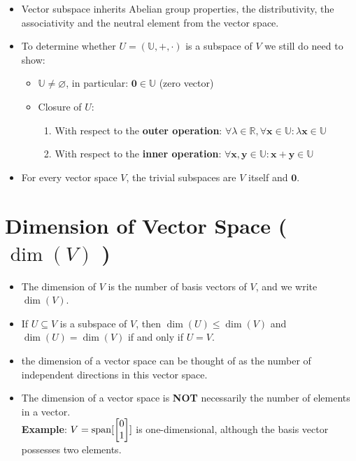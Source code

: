 \begin{itemize}
    \item Vector subspace inherits Abelian group properties, the distributivity, the associativity and the neutral element from the vector space.

    \item To determine whether $U = (\mathbb{U}, +, \cdot)$ is a subspace of $V$ we still do need to show:
    \begin{itemize}
        \item $\mathbb{U} \neq \varnothing$, in particular: $\mathbf{0} \in \mathbb{U}$ (zero vector)
        \item Closure of $U$:
        \begin{enumerate}
            \item With respect to the \textbf{outer operation}: $\forall\lambda \in \mathbb{R}, \forall\mathbf{x} \in \mathbb{U} : \lambda \mathbf{x} \in \mathbb{U}$
            \item With respect to the \textbf{inner operation}: $\forall\mathbf{x, y} \in \mathbb{U} : \mathbf{x + y} \in \mathbb{U}$
        \end{enumerate}
    \end{itemize}

    \item For every vector space $V$, the trivial subspaces are $V$ itself and ${\mathbf{0}}$.
    
\end{itemize}

\section{Dimension of Vector Space ( $\dim(V)$ ) \cite{mfml-1}}\label{lin-alg: Dimension-vector-space}

\begin{itemize}
    \item The dimension of $V$ is the number of basis vectors of $V$, and we write $\dim(V)$.

    \item If $U \subseteq V$ is a subspace of $V$, then $\dim(U) \leq \dim(V)$ and $\dim(U) = \dim(V)$ if and only if $U = V$.

    \item the dimension of a vector space can be thought of as the number of independent directions in this vector space.

    \item The dimension of a vector space is \textbf{NOT} necessarily the number of elements in a vector.\\
    \textbf{Example}: $V = \operatorname{span}[\begin{bmatrix}0\\1\end{bmatrix}]$ is one-dimensional, although the basis vector possesses two elements.
    
\end{itemize}



